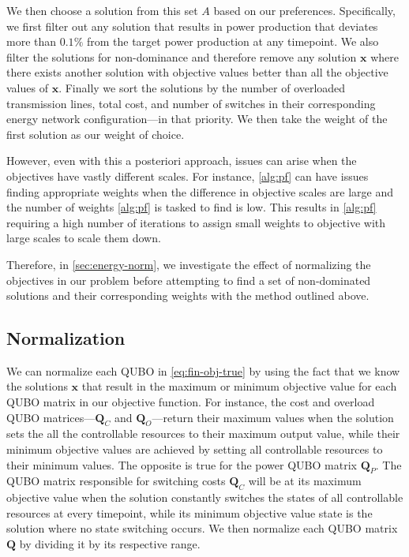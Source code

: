 \documentclass[conference]{IEEEtran}
\makeatletter
\newcommand{\bQ}{\boldsymbol{Q}}
\newcommand{\bx}{\boldsymbol{x}}
\newcommand{\QUBO}{\textsc{QUBO}\@\xspace}
\makeatother
\begin{document}
We then choose a solution from this set $A$ based on our
preferences. Specifically, we first filter out any solution that results
in power production that deviates more than $0.1\%$ from the target
power production at any timepoint. We also filter the solutions for
non-dominance and therefore remove any solution $\bx$ where there exists
another solution with objective values better than all the objective
values of $\bx$. Finally we sort the solutions by the number of
overloaded transmission lines, total cost, and number of switches in
their corresponding energy network configuration---in that priority. We
then take the weight of the first solution as our weight of choice.

However, even with this a posteriori approach, issues can arise when the
objectives have vastly different scales. For instance, \cref{alg:pf} can
have issues finding appropriate weights when the difference in objective
scales are large and the number of weights \cref{alg:pf} is tasked to
find is low. This results in \cref{alg:pf} requiring a high number of
iterations to assign small weights to objective with large scales to
scale them down.

Therefore, in \cref{sec:energy-norm}, we investigate the effect of
normalizing the objectives in our problem before attempting to find a
set of non-dominated solutions and their corresponding weights with the
method outlined above.

\subsection{Normalization}\label{sec:norm}
We can normalize each {\QUBO} in \cref{eq:fin-obj-true} by using the
fact that we know the solutions $\bx$ that result in the maximum or
minimum objective value for each {\QUBO} matrix in our objective
function. For instance, the cost and overload {\QUBO}
matrices---$\bQ_{C}$ and $\bQ_{O}$---return their maximum values when
the solution sets the all the controllable resources to their maximum
output value, while their minimum objective values are achieved by
setting all controllable resources to their minimum values. The opposite
is true for the power {\QUBO} matrix $\bQ_{P}$. The {\QUBO} matrix
responsible for switching costs $\bQ_{C}$ will be at its maximum
objective value when the solution constantly switches the states of all
controllable resources at every timepoint, while its minimum objective
value state is the solution where no state switching occurs. We then
normalize each {\QUBO} matrix $\bQ$ by dividing it by its respective
range.
\end{document}
